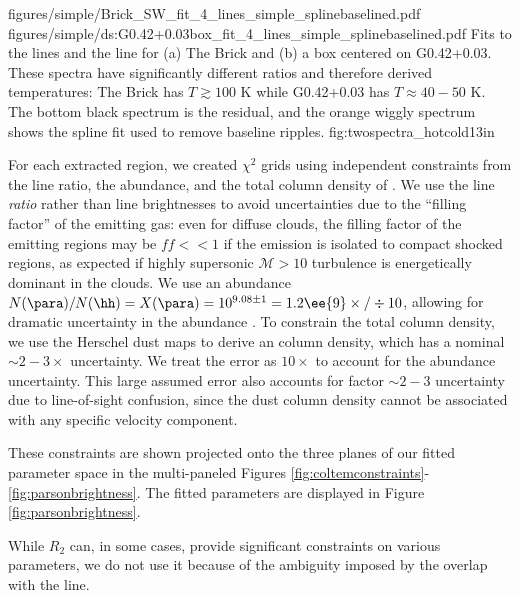 \FigureTwo
{figures/simple/Brick_SW_fit_4_lines_simple_splinebaselined.pdf}
{figures/simple/ds:G0.42+0.03box_fit_4_lines_simple_splinebaselined.pdf}
{
Fits to the \para lines and the \methanol \fourtwotwo line for (a) The Brick
and (b) a box centered on G0.42+0.03.  These spectra have significantly
different ratios and therefore derived temperatures: The Brick has
$T\gtrsim100$ K while G0.42+0.03 has $T\approx40-50$ K.  The bottom black
spectrum is the residual, and the orange wiggly spectrum shows the spline fit
used to remove baseline ripples.}
{fig:twospectra_hotcold}{1}{3in}


For each extracted region, we created $\chi^2$ grids using independent
constraints from the line ratio, the \formaldehyde abundance, and the total
column density of \hh.  We use the line \emph{ratio} rather than line
brightnesses to avoid uncertainties due to the ``filling factor'' of the
emitting gas: even for diffuse clouds, the filling factor of the emitting
regions may be $ff<<1$ if the emission is isolated to compact shocked regions,
as expected if highly supersonic $\mathcal{M}>10$ turbulence is energetically
dominant in the clouds.  We use an abundance $N(\para)/N(\hh) = X(\para) =
10^{9.08\pm1} = 1.2\ee{9} \times/\div 10$, allowing for dramatic uncertainty in
the \formaldehyde abundance
\citep{Ginsburg2013a,Carey1998a,Wootten1978a,Mundy1987a}.  To constrain the
total column density, we use the Herschel dust maps to derive an \hh column
density, which has a nominal $\sim2-3\times$ uncertainty.  We treat the error
as $10\times$ to account for the abundance uncertainty.  This large assumed
error also accounts for factor $\sim2-3$ uncertainty due to line-of-sight
confusion, since the dust column density cannot be associated with any specific
velocity component.

These constraints are shown projected onto the three planes of our fitted
parameter space in the multi-paneled Figures
\ref{fig:coltemconstraints}-\ref{fig:parsonbrightness}.  The fitted parameters
are displayed in Figure \ref{fig:parsonbrightness}.

While $R_2$ can, in some cases, provide significant constraints on various
parameters, we do not use it because of the ambiguity imposed by the overlap
with the \methanol \fourtwotwo line.




